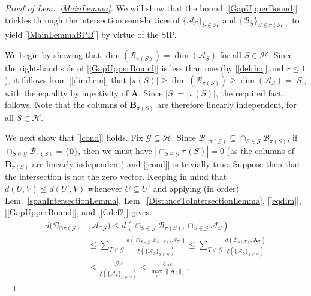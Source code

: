 \documentclass[9pt,twocolumn]{pnas-new}
\renewcommand{\eqref}[1]{\textnormal{[\ref{#1}]}}
\begin{document}
\begin{proof}[Proof of Lem.~\ref{MainLemma}]
We will show that the bound \eqref{GapUpperBound} trickles through the intersection semi-lattices of $\{\bm{\mathcal{A}}_S\}_{S \in \mathcal{H}}$ and $\{\bm{\mathcal{B}}_{\bar S}\}_{\bar S \in \pi(\mathcal{H})}$ to yield \eqref{MainLemmaBPD} by virtue of the SIP.  

We begin by showing that $\dim(\bm{\mathcal{B}}_{\pi(S)}) = \dim(\bm{\mathcal{A}}_S)$ for all $S \in \mathcal{H}$. Since the right-hand side of \eqref{GapUpperBound} is less than one (by \eqref{delrho} and $r \leq 1$), it follows from \eqref{dimLem} that $|\pi(S)| \geq \dim(\bm{\mathcal{B}}_{\pi(S)}) \geq \dim(\bm{\mathcal{A}}_S) = |S|$, with the equality by injectivity of $\mathbf{A}$. Since $|S| = |\pi(S)|$, the required fact follows. Note that the columns of $\mathbf{B}_{\pi(S)}$ are therefore linearly independent, for all $S \in \mathcal{H}$.

We next show that \eqref{cond} holds.  Fix $\mathcal{G} \subseteq \mathcal{H}$. Since $\bm{\mathcal{B}}_{\cap \pi(\mathcal{G})} \subseteq \cap_{S \in \mathcal{G}} \bm{\mathcal{B}}_{\pi(S)}$, if $\cap_{S \in \mathcal{G}} \bm{\mathcal{B}}_{\pi(S)} = \{\textbf{0}\}$, then we must have $|\cap_{S \in \mathcal{G}} \pi(S)| = 0$ (as the columns of $\mathbf{B}_{\pi(S)}$ are linearly independent) and \eqref{cond} is trivially true. Suppose then that the intersection is not the zero vector. Keeping in mind that $d(U,V) \leq d(U',V)$ whenever $U \subseteq U'$ and applying (in order) Lem.~\ref{spanIntersectionLemma}, Lem.~\ref{DistanceToIntersectionLemma}, \eqref{eqdim}, \eqref{GapUpperBound}, and \eqref{Cdef2} gives:
\begin{align}\label{randoml}
d(\bm{\mathcal{B}}_{\cap \pi(\mathcal{G})}&, \bm{\mathcal{A}}_{\cap \mathcal{G}}  ) 
\leq d\left( \cap_{S \in \mathcal{G}} \bm{\mathcal{B}}_{\pi(S)}, \cap_{S \in \mathcal{G}} \bm{\mathcal{A}}_S \right) \nonumber \\
&\leq \sum_{T \in \mathcal{G}} \frac{ d\left( \cap_{S \in \mathcal{G}} \bm{\mathcal{B}}_{\pi(S)},\bm{\mathcal{A}_{T}} \right) }{ \xi(  \{\bm{\mathcal{A}}_S\}_{S \in \mathcal{G}}) }
\leq \sum_{T \in \mathcal{G}} \frac{ d\left( \bm{\mathcal{B}}_{\pi(T)},\bm{\mathbf{A}}_{T} \right) }{ \xi( \{\bm{\mathcal{A}}_S\}_{S \in \mathcal{G}}) }\nonumber \\
&\leq \frac{|\mathcal{G}| \varepsilon}{\xi( \{\bm{\mathcal{A}}_S\}_{S \in \mathcal{G}})} 
\leq \frac{C_2 \varepsilon}{\max_i\|\mathbf{A}_i\|_2}. 
\end{align}


\end{proof}
\end{document}
